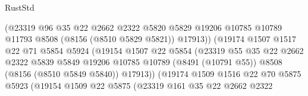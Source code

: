 \begin{lexlean}{RustStd}
\begin{coremodule}
{\begin{coremodule}
{{{{{{{{{{{{{{{{{{{{{{{{{{{{{{{{{{                                    (@23319
                                      @96
                                      @35
                                      @22
                                      @2662
                                      @2322
                                      @5820
                                      @5829
                                      @19206
                                      @10785
                                      @10789
                                      @11793
                                      @8508
                                      (@8156 (@8510 @5829 @5821))
                                      @17913))
                                  (@19174
                                    @1507
                                    @1517
                                    @22
                                    @71
                                    @5854
                                    @5924
                                    (@19154
                                      @1507
                                      @22
                                      @5854
                                      (@23319
                                        @55
                                        @35
                                        @22
                                        @2662
                                        @2322
                                        @5839
                                        @5849
                                        @19206
                                        @10785
                                        @10789
                                        (@8491 (@10791 @55))
                                        @8508
                                        (@8156 (@8510 @5849 @5840))
                                        @17913))
                                    (@19174
                                      @1509
                                      @1516
                                      @22
                                      @70
                                      @5875
                                      @5923
                                      (@19154
                                        @1509
                                        @22
                                        @5875
                                        (@23319
                                          @161
                                          @35
                                          @22
                                          @2662
                                          @2322
}}}}}}}}}}}}}}}}}}}}}}}}}}}}}}}}}}
\end{coremodule}}
\end{coremodule}
\end{lexlean}
